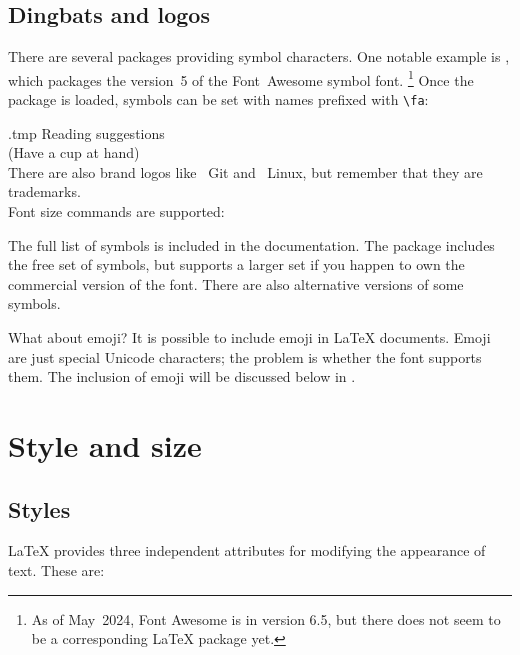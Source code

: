 %
%
\subsection{Dingbats and logos}

There are several packages providing symbol characters.
One notable example is ,
which packages the version~5 of the Font~Awesome symbol font.%
\footnote{As of May~2024, Font Awesome is in version 6.5,
but there does not seem to be a corresponding \LaTeX{} package yet.}
Once the package is loaded, symbols can be set with names prefixed with \verb|\fa|:
%
\begin{VerbatimOut}{\jobname.tmp}
\faBook{} Reading suggestions\\
\faCoffee{} (Have a cup at hand)\\

There are also brand logos like
\faGit*~Git and \faLinux~Linux,
but remember that they are trademarks.\\

Font size commands are supported:
{\tiny\faPoop}~{\faPoop}~{\Large\faPoop}
\end{VerbatimOut}
\ShowExample
%
The full list of symbols is included in the documentation.
The package includes the free set of symbols,
but supports a larger set if you happen to own the commercial version of the font.
There are also alternative versions of some symbols.


What about emoji?
It is possible to include emoji in \LaTeX{} documents.
Emoji are just special Unicode characters;
the problem is whether the font supports them.
The inclusion of emoji will be discussed below in .


%
%
%
\section{Style and size}\label{sec:font attributes}

\subsection{Styles}
\LaTeX{} provides three independent attributes for modifying the appearance of text.
These are:

